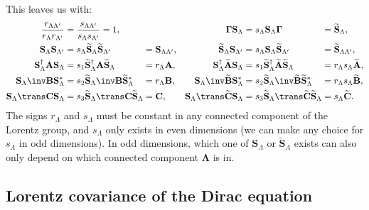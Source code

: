 \documentclass[11pt]{article}
\newcommand{\cc}{^\ast}
\newcommand{\hc}{^\dag}
\newcommand{\Gammab}{\boldsymbol{\Gamma}}
\renewcommand{\S}{\mathbf{S}}
\newcommand{\A}{\mathbf{A}}
\newcommand{\B}{\mathbf{B}}
\renewcommand{\C}{\mathbf{C}}
\newcommand{\At}{\widetilde{\A}}
\newcommand{\Bt}{\widetilde{\B}}
\newcommand{\Ct}{\widetilde{\C}}
\newcommand{\St}{\widetilde{\S}}
\newcommand{\Lambdab}{\boldsymbol{\Lambda}}
\begin{document}
This leaves us with:
%
\begin{equation}\label{eq:constnormlorentz}
\begin{alignedat}{4}
  \frac{r_{\Lambda\Lambda'}}{r_{\Lambda} r_{\Lambda'}}
    &= \frac{s_{\Lambda\Lambda'}}{s_{\Lambda} s_{\Lambda'}} 
    = 1, &&&
  \Gammab \S_\Lambda 
    &= s_\Lambda \S_\Lambda \Gammab &
    &= \St_\Lambda, \\
  \S_\Lambda \S_{\Lambda'} 
    &= s_{\Lambda} \St_\Lambda \St_{\Lambda'} &
    &= \S_{\Lambda\Lambda'}, &
  \St_\Lambda \S_{\Lambda'}
    &= s_{\Lambda} \S_\Lambda \St_{\Lambda'} &
    &= \St_{\Lambda\Lambda'}, \\ 
  \S_\Lambda\hc \A \S_\Lambda 
    &= s_1 \St_\Lambda\hc \A \St_\Lambda &
    &= r_\Lambda \A, &
  \S_\Lambda\hc \At \S_\Lambda 
    &= s_1 \St_\Lambda\hc \At \St_\Lambda &
    &= r_\Lambda s_\Lambda \At, \\
  \S_\Lambda\inv \B \S_\Lambda\cc 
    &= s_2 \St_\Lambda\inv \B \St_\Lambda\cc &
    &= r_\Lambda \B, &\qquad
  \S_\Lambda\inv \Bt \S_\Lambda\cc 
    &= s_2 \St_\Lambda\inv \Bt \St_\Lambda\cc &
    &= r_\Lambda s_\Lambda \Bt, \\ 
  \S_\Lambda\trans \C \S_\Lambda 
    &= s_3 \St_\Lambda\trans \C \St_\Lambda &
    &= \C, & 
  \S_\Lambda\trans \Ct \S_\Lambda 
    &= s_3 \St_\Lambda\trans \Ct \St_\Lambda &
    &= s_\Lambda \Ct. 
\end{alignedat}
\end{equation}
%
The signs \(r_\Lambda\) and \(s_\Lambda\) must be constant in any connected component of the Lorentz group,
and \(s_\Lambda\) only exists in even dimensions 
(we can make any choice for \(s_\Lambda\)  in odd dimensions).
In odd dimensions, which one of \(\S_\Lambda\) or \(\St_\Lambda\) exists can also only depend on which connected component \(\Lambdab\) is in.
  

\subsection{Lorentz covariance of the Dirac equation}\label{sec:diraclorentz}
\end{document}
